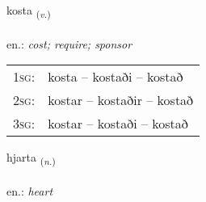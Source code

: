 \documentclass[frontgrid, backgrid]{flacards}\usepackage[]{graphicx}\usepackage[]{xcolor}
\begin{document}
\renewcommand{\flhead}{\vskip5pt \fboxsep=0pt {\small\bfseries\footnotesize Sagnorð | Verb}}
\renewcommand{\fcfoot}{\vskip5pt \fboxsep=0pt \hspace{2pt}{\small\bfseries\footnotesize 1K}}

\renewcommand{\blhead}{\vskip5pt {\small\bfseries\footnotesize Sagnorð | Verb }}
\renewcommand{\bcfoot}{\vskip5pt \hspace{2pt}{\small\bfseries\footnotesize 1K}}


{kosta \small{\textsubscript{(\textit{v.})}} \\[1ex] %
\textphonetic{[kʰɔsta]} \\
en.: \emph{cost; require; sponsor} \\  [2ex]
\renewcommand*{\arraystretch}{0.8}
\begin{tabular}{p{1cm}l}
\textsc{1sg}: & kosta -- kostaði -- kostað \\ 
\textsc{2sg}: & kostar -- kostaðir -- kostað \\ 
\textsc{3sg}: & kostar -- kostaði -- kostað \\ 
\end{tabular}
}

\renewcommand{\flhead}{\vskip5pt \fboxsep=0pt {\small\bfseries\footnotesize Nafnorð | Noun}}
\renewcommand{\fcfoot}{\vskip5pt \fboxsep=0pt \hspace{2pt}{\small\bfseries\footnotesize 1K}}

\renewcommand{\blhead}{\vskip5pt {\small\bfseries\footnotesize Nafnorð | Noun }}
\renewcommand{\bcfoot}{\vskip5pt \hspace{2pt}{\small\bfseries\footnotesize 1K}}


{hjarta \small{\textsubscript{(\textit{n.})}} \\[1ex] %
\textphonetic{[çar̥ta]} \\
en.: \emph{heart} \\  [2ex]
\renewcommand*{\arraystretch}{0.8}
}
\end{document}
